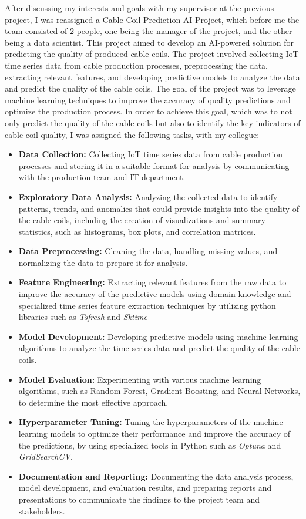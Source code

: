 After discussing my interests and goals with my supervisor at the previous
project, I was reassigned a Cable Coil Prediction AI Project, which before me the team
consisted of 2 people, one being the manager of the project, and the other
being a data scientist. This project aimed to develop an AI-powered
solution for predicting the quality of produced cable coils. The project
involved collecting IoT time series data from cable production processes,
preprocessing the data, extracting relevant features, and developing predictive
models to analyze the data and predict the quality of the cable coils. The goal
of the project was to leverage machine learning techniques to improve the
accuracy of quality predictions and optimize the production process. In order
to achieve this goal, which was to not only predict the quality of the cable
coils but also to identify the key indicators of cable coil quality, I was
assigned the following tasks, with my collegue:
\begin{itemize}
    \item \textbf{Data Collection:} Collecting IoT time series data from cable production processes and storing it in a suitable format for analysis by communicating with the production team and IT department.
    \item \textbf{Exploratory Data Analysis:} Analyzing the collected data to identify patterns, trends, and anomalies that could provide insights into the quality of the cable coils, including the creation of visualizations and summary statistics, such as histograms, box plots, and correlation matrices.
    \item \textbf{Data Preprocessing:} Cleaning the data, handling missing values, and normalizing the data to prepare it for analysis.
    \item \textbf{Feature Engineering:} Extracting relevant features from the raw data to improve the accuracy of the predictive models using domain knowledge and specialized time series feature extraction techniques by utilizing python libraries such as \emph{Tsfresh} and \emph{Sktime}
    \item \textbf{Model Development:} Developing predictive models using machine learning algorithms to analyze the time series data and predict the quality of the cable coils.
    \item \textbf{Model Evaluation:} Experimenting with various machine learning algorithms, such as Random Forest, Gradient Boosting, and Neural Networks, to determine the most effective approach.
    \item \textbf{Hyperparameter Tuning:} Tuning the hyperparameters of the machine learning models to optimize their performance and improve the accuracy of the predictions, by using specialized tools in Python such as \emph{Optuna} and \emph{GridSearchCV}.
    \item \textbf{Documentation and Reporting:} Documenting the data analysis process, model development, and evaluation results, and preparing reports and presentations to communicate the findings to the project team and stakeholders.
\end{itemize}
